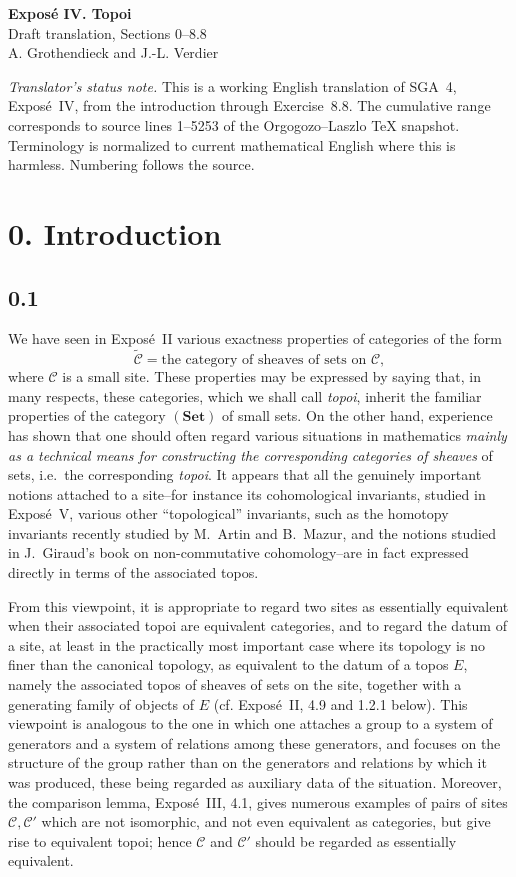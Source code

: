 \documentclass[11pt]{article}
\newcommand{\C}{\mathcal{C}}
\newcommand{\Set}{\mathbf{Set}}
\newcommand{\ie}{i.e.}
\begin{document}
\begin{center}
{\Large \textbf{Expos\'e IV. Topoi}}\\[0.35em]
{\large Draft translation, Sections 0--8.8}\\[0.35em]
A. Grothendieck and J.-L. Verdier
\end{center}

\bigskip

\noindent\emph{Translator's status note.} This is a working English translation of SGA~4, Expos\'e~IV, from the introduction through Exercise~8.8. The cumulative range corresponds to source lines 1--5253 of the Orgogozo--Laszlo TeX snapshot. Terminology is normalized to current mathematical English where this is harmless. Numbering follows the source.

\section*{0. Introduction}

\subsection*{0.1}
We have seen in Expos\'e~II various exactness properties of categories of the form
\[
\widetilde{\C}=\text{the category of sheaves of sets on }\C,
\]
where \(\C\) is a small site. These properties may be expressed by saying that, in many respects, these categories, which we shall call \emph{topoi}, inherit the familiar properties of the category \((\Set)\) of small sets. On the other hand, experience has shown that one should often regard various situations in mathematics \emph{mainly as a technical means for constructing the corresponding categories of sheaves} of sets, \ie\ the corresponding \emph{topoi}. It appears that all the genuinely important notions attached to a site--for instance its cohomological invariants, studied in Expos\'e~V, various other ``topological'' invariants, such as the homotopy invariants recently studied by M.~Artin and B.~Mazur, and the notions studied in J.~Giraud's book on non-commutative cohomology--are in fact expressed directly in terms of the associated topos.

From this viewpoint, it is appropriate to regard two sites as essentially equivalent when their associated topoi are equivalent categories, and to regard the datum of a site, at least in the practically most important case where its topology is no finer than the canonical topology, as equivalent to the datum of a topos \(E\), namely the associated topos of sheaves of sets on the site, together with a generating family of objects of \(E\) (cf. Expos\'e~II, 4.9 and 1.2.1 below). This viewpoint is analogous to the one in which one attaches a group to a system of generators and a system of relations among these generators, and focuses on the structure of the group rather than on the generators and relations by which it was produced, these being regarded as auxiliary data of the situation. Moreover, the comparison lemma, Expos\'e~III, 4.1, gives numerous examples of pairs of sites \(\C,\C'\) which are not isomorphic, and not even equivalent as categories, but give rise to equivalent topoi; hence \(\C\) and \(\C'\) should be regarded as essentially equivalent.
\end{document}
